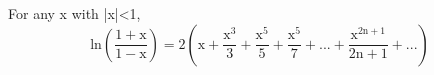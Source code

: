 For any x with |x|<1,
\[ \mathrm{ln} \left ( \frac{1+ \mathrm{x}}{1 - \mathrm{x}} \right )
= 2 \left (
\mathrm{x}
+ \frac{\mathrm{x}^3}{3}
+ \frac{\mathrm{x}^5}{5}
+ \frac{\mathrm{x}^5}{7}
+ ...
+ \frac{\mathrm{x}^{2 \mathrm{n} + 1} } {2 \mathrm{n} + 1 } 
+ ... \right ) 
\]